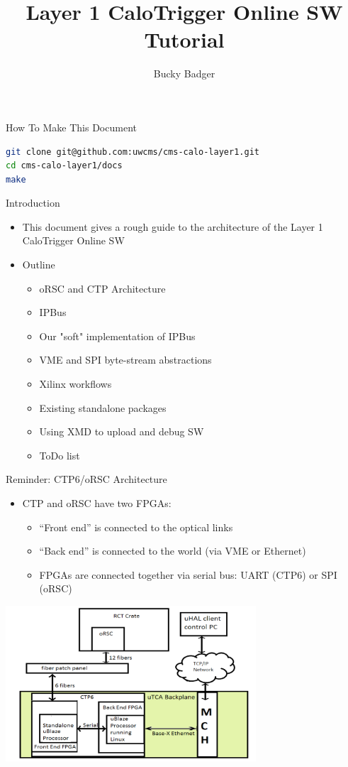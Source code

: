 \documentclass{beamer}
\title[UW Layer-1 SW Tutorial]{Layer 1 CaloTrigger Online SW Tutorial}
\author{Bucky Badger}
\institute{UW Madison}
\begin{document}
\begin{frame}
\titlepage
\end{frame}

\begin{frame}[fragile]{How To Make This Document}
\begin{lstlisting}[language=bash]
git clone git@github.com:uwcms/cms-calo-layer1.git
cd cms-calo-layer1/docs
make
\end{lstlisting}
\end{frame}

\begin{frame}{Introduction}
\begin{itemize}
\item This document gives a rough guide to the architecture of the Layer 1 CaloTrigger Online SW
\item Outline
\begin{itemize}
\item oRSC and CTP Architecture
\item IPBus
\item Our "soft" implementation of IPBus
\item VME and SPI byte-stream abstractions
\item Xilinx workflows
\item Existing standalone packages
\item Using XMD to upload and debug SW
\item ToDo list
\end{itemize}
\end{itemize}
\end{frame}

\begin{frame}{Reminder: CTP6/oRSC Architecture}
\begin{itemize}
\item CTP and oRSC have two FPGAs:
\begin{itemize}
\item ``Front end'' is connected to the optical links 
\item ``Back end'' is connected to the world (via VME or Ethernet)
\item FPGAs are connected together via serial bus: UART (CTP6) or SPI (oRSC)
\end{itemize}
\end{itemize}
\begin{center}
\includegraphics[width=0.7\textwidth]{images/orsc_ctp_ipbus_interface.pdf}
\end{center}
\end{frame}
\end{document}
